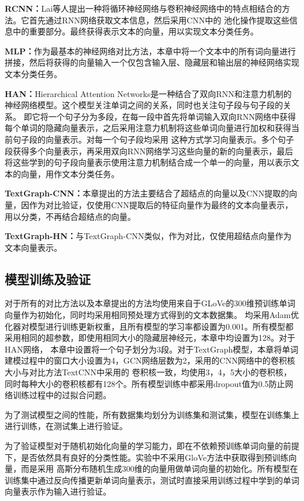 \textbf{RCNN：}Lai等人提出一种将循环神经网络与卷积神经网络中的特点相结合的方法。它首先通过RNN网络获取文本信息，然后采用CNN中的
池化操作提取这些信息中的重要部分。最终获得表示文本的向量，用以实现文本分类任务。

\textbf{MLP：}作为最基本的神经网络对比方法，本章中将一个文本中的所有词向量进行拼接，然后将获得的向量输入一个仅包含输入层、隐藏层和输出层的神经网络实现文本分类任务。

\textbf{HAN：}Hierarchical Attention Networks是一种结合了双向RNN和注意力机制的神经网络模型。这个模型关注单词之间的关系，同时也关注句子段与句子段的关系。
即它将一个句子分为多段，在每一段中首先将单词输入双向RNN网络中获得每个单词的隐藏向量表示，之后采用注意力机制将这些单词向量进行加权和获得当前句子段的向量表示。对每一个句子段均采用
这种方式学习向量表示。多个句子段获得多个向量表示，再采用双向RNN网络学习这些向量的新的向量表示，最后将这些学到的句子段向量表示使用注意力机制结合成一个单一的向量，用以表示文本的向量，用作文本分类任务。

\textbf{TextGraph-CNN：}本章提出的方法主要结合了超结点的向量以及CNN提取的向量，因作为对比验证，仅使用CNN提取后的特征向量作为最终的文本向量表示，用以分类，不再结合超结点的向量。

\textbf{TextGraph-HN：}与TextGraph-CNN类似，作为对比，仅使用超结点向量作为文本向量表示。
\subsection{模型训练及验证}
对于所有的对比方法以及本章提出的方法均使用来自于GLoVe的300维预训练单词向量作为初始化，同时均采用相同预处理方式得到的文本数据集。
均采用Adam优化器对模型进行训练更新权重，且所有模型的学习率都设置为0.001。所有模型都采用相同的超参数，即使用相同大小的隐藏层神经元，本章中均设置为128。对于HAN网络，
本章中设置将一个句子划分为3段。对于TextGraph模型，本章将单词建模过程中的窗口大小设置为4，GCN网络层数为2，采用的CNN网络中的卷积核大小与对比方法TextCNN中采用的
卷积核一致，均使用3，4，5大小的卷积核，同时每种大小的卷积核都有128个。所有模型训练中都采用dropout值为0.5防止网络训练过程中的过拟合问题。

为了测试模型之间的性能，所有数据集均划分为训练集和测试集，模型在训练集上进行训练，在测试集上进行验证。

为了验证模型对于随机初始化向量的学习能力，即在不依赖预训练单词向量的前提下，是否依然具有良好的分类性能。实验中不采用GloVe方法中获取得到预训练向量，而是采用
高斯分布随机生成300维的向量用做单词向量的初始化。所有模型在训练集中通过反向传播更新单词向量表示，测试时直接采用训练过程中学到的单词向量表示作为输入进行验证。

